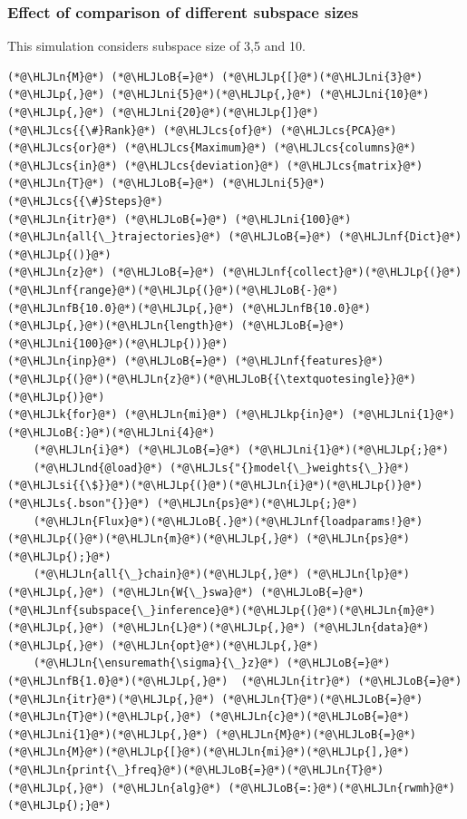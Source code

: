 \documentclass[12pt,a4paper]{article}
\newcommand{\HLJLk}[1]{\textcolor[RGB]{148,91,176}{\textbf{#1}}}
\newcommand{\HLJLkp}[1]{\textcolor[RGB]{148,91,176}{\textbf{#1}}}
\newcommand{\HLJLn}[1]{#1}
\newcommand{\HLJLnd}[1]{\textcolor[RGB]{214,102,97}{#1}}
\newcommand{\HLJLnf}[1]{\textcolor[RGB]{66,102,213}{#1}}
\newcommand{\HLJLs}[1]{\textcolor[RGB]{201,61,57}{#1}}
\newcommand{\HLJLsi}[1]{#1}
\newcommand{\HLJLnfB}[1]{\textcolor[RGB]{59,151,46}{#1}}
\newcommand{\HLJLni}[1]{\textcolor[RGB]{59,151,46}{#1}}
\newcommand{\HLJLoB}[1]{\textcolor[RGB]{102,102,102}{\textbf{#1}}}
\newcommand{\HLJLp}[1]{#1}
\newcommand{\HLJLcs}[1]{\textcolor[RGB]{153,153,119}{\textit{#1}}}
\begin{document}
\subsubsection{Effect of comparison of different subspace sizes}
This simulation considers subspace size of 3,5 and 10.


\begin{lstlisting}
(*@\HLJLn{M}@*) (*@\HLJLoB{=}@*) (*@\HLJLp{[}@*)(*@\HLJLni{3}@*)(*@\HLJLp{,}@*) (*@\HLJLni{5}@*)(*@\HLJLp{,}@*) (*@\HLJLni{10}@*)(*@\HLJLp{,}@*) (*@\HLJLni{20}@*)(*@\HLJLp{]}@*) (*@\HLJLcs{{\#}Rank}@*) (*@\HLJLcs{of}@*) (*@\HLJLcs{PCA}@*) (*@\HLJLcs{or}@*) (*@\HLJLcs{Maximum}@*) (*@\HLJLcs{columns}@*) (*@\HLJLcs{in}@*) (*@\HLJLcs{deviation}@*) (*@\HLJLcs{matrix}@*)
(*@\HLJLn{T}@*) (*@\HLJLoB{=}@*) (*@\HLJLni{5}@*) (*@\HLJLcs{{\#}Steps}@*)
(*@\HLJLn{itr}@*) (*@\HLJLoB{=}@*) (*@\HLJLni{100}@*)
(*@\HLJLn{all{\_}trajectories}@*) (*@\HLJLoB{=}@*) (*@\HLJLnf{Dict}@*)(*@\HLJLp{()}@*)
(*@\HLJLn{z}@*) (*@\HLJLoB{=}@*) (*@\HLJLnf{collect}@*)(*@\HLJLp{(}@*)(*@\HLJLnf{range}@*)(*@\HLJLp{(}@*)(*@\HLJLoB{-}@*)(*@\HLJLnfB{10.0}@*)(*@\HLJLp{,}@*) (*@\HLJLnfB{10.0}@*)(*@\HLJLp{,}@*)(*@\HLJLn{length}@*) (*@\HLJLoB{=}@*) (*@\HLJLni{100}@*)(*@\HLJLp{))}@*)
(*@\HLJLn{inp}@*) (*@\HLJLoB{=}@*) (*@\HLJLnf{features}@*)(*@\HLJLp{(}@*)(*@\HLJLn{z}@*)(*@\HLJLoB{{\textquotesingle}}@*)(*@\HLJLp{)}@*)
(*@\HLJLk{for}@*) (*@\HLJLn{mi}@*) (*@\HLJLkp{in}@*) (*@\HLJLni{1}@*)(*@\HLJLoB{:}@*)(*@\HLJLni{4}@*)
    (*@\HLJLn{i}@*) (*@\HLJLoB{=}@*) (*@\HLJLni{1}@*)(*@\HLJLp{;}@*)
    (*@\HLJLnd{@load}@*) (*@\HLJLs{"{}model{\_}weights{\_}}@*)(*@\HLJLsi{{\$}}@*)(*@\HLJLp{(}@*)(*@\HLJLn{i}@*)(*@\HLJLp{)}@*)(*@\HLJLs{.bson"{}}@*) (*@\HLJLn{ps}@*)(*@\HLJLp{;}@*)
    (*@\HLJLn{Flux}@*)(*@\HLJLoB{.}@*)(*@\HLJLnf{loadparams!}@*)(*@\HLJLp{(}@*)(*@\HLJLn{m}@*)(*@\HLJLp{,}@*) (*@\HLJLn{ps}@*)(*@\HLJLp{);}@*)
    (*@\HLJLn{all{\_}chain}@*)(*@\HLJLp{,}@*) (*@\HLJLn{lp}@*)(*@\HLJLp{,}@*) (*@\HLJLn{W{\_}swa}@*) (*@\HLJLoB{=}@*) (*@\HLJLnf{subspace{\_}inference}@*)(*@\HLJLp{(}@*)(*@\HLJLn{m}@*)(*@\HLJLp{,}@*) (*@\HLJLn{L}@*)(*@\HLJLp{,}@*) (*@\HLJLn{data}@*)(*@\HLJLp{,}@*) (*@\HLJLn{opt}@*)(*@\HLJLp{,}@*)
	(*@\HLJLn{\ensuremath{\sigma}{\_}z}@*) (*@\HLJLoB{=}@*) (*@\HLJLnfB{1.0}@*)(*@\HLJLp{,}@*)	(*@\HLJLn{itr}@*) (*@\HLJLoB{=}@*)(*@\HLJLn{itr}@*)(*@\HLJLp{,}@*) (*@\HLJLn{T}@*)(*@\HLJLoB{=}@*)(*@\HLJLn{T}@*)(*@\HLJLp{,}@*) (*@\HLJLn{c}@*)(*@\HLJLoB{=}@*)(*@\HLJLni{1}@*)(*@\HLJLp{,}@*) (*@\HLJLn{M}@*)(*@\HLJLoB{=}@*)(*@\HLJLn{M}@*)(*@\HLJLp{[}@*)(*@\HLJLn{mi}@*)(*@\HLJLp{],}@*) (*@\HLJLn{print{\_}freq}@*)(*@\HLJLoB{=}@*)(*@\HLJLn{T}@*)(*@\HLJLp{,}@*) (*@\HLJLn{alg}@*) (*@\HLJLoB{=:}@*)(*@\HLJLn{rwmh}@*)(*@\HLJLp{);}@*)    
    

\end{lstlisting}
\end{document}
